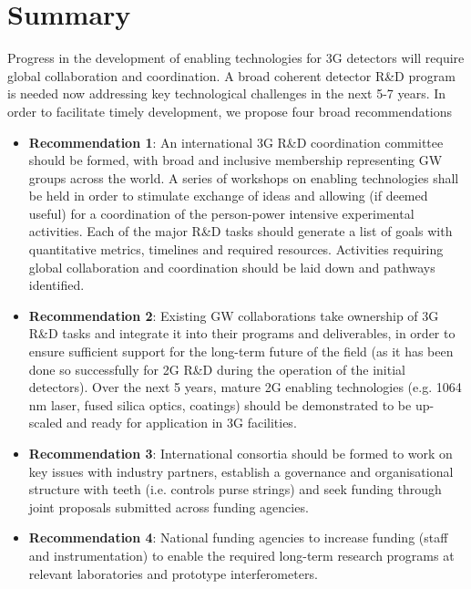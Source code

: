 \chapter{Summary}
\label{sec:Summary}

Progress in the development of enabling technologies for 3G detectors will require global collaboration and coordination. A broad coherent detector R\&D program is needed now addressing key technological challenges in the next 5-7 years. In order to facilitate timely development, we propose four broad recommendations

\begin{itemize}
\item \textbf{Recommendation 1}:  An international 3G R\&D coordination committee should be formed, with broad and inclusive membership representing GW groups across the world. A series of workshops on enabling technologies shall be held in order to stimulate exchange of ideas and allowing (if deemed useful) for a coordination of the person-power intensive experimental activities.  Each of the major R\&D tasks should generate a list of  goals with quantitative metrics,  timelines and required resources.   Activities requiring global collaboration and coordination should be laid down and pathways identified.
\item \textbf{Recommendation 2}: Existing GW collaborations take ownership of 3G R\&D tasks and integrate it into their programs and deliverables, in order to ensure sufficient support for the long-term future of the field (as it has been done so successfully for 2G R\&D during the operation of the initial detectors). Over the next 5 years, mature 2G enabling technologies (e.g. 1064\,nm laser, fused silica optics, coatings) should be demonstrated to be up-scaled and ready for application in 3G facilities.
\item \textbf{Recommendation 3}:  International consortia should be formed to work on key issues with industry partners, establish a governance and organisational structure with teeth (i.e. controls purse strings) and seek funding through joint proposals submitted across funding agencies.
\item \textbf{Recommendation 4}: National funding agencies to increase funding (staff and instrumentation)   to enable the required long-term research programs at relevant laboratories and prototype interferometers.
\end{itemize}
